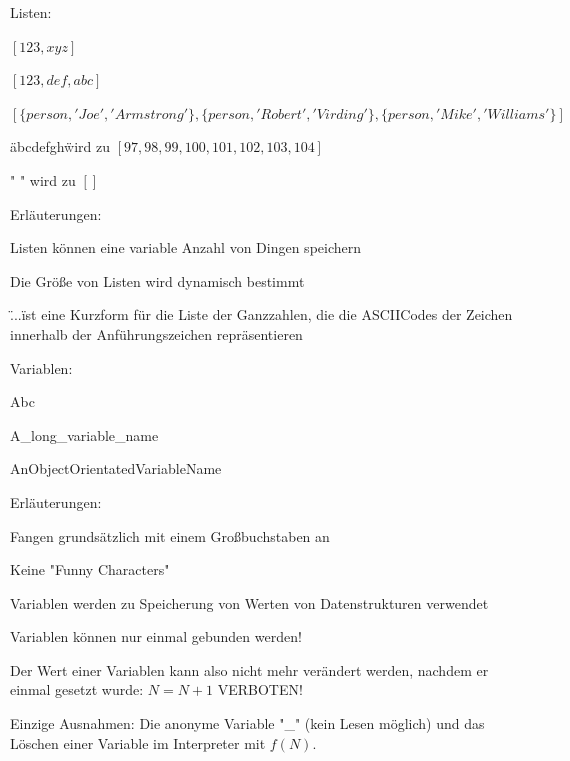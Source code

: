 \documentclass[10pt]{article}
\begin{document}
Listen:
\begin{itemize*}
  \item $[123, xyz]$
  \item $[123, def, abc]$
  \item $[\{person, 'Joe', 'Armstrong'\}, \{person, 'Robert', 'Virding'\}, \{person, 'Mike', 'Williams'\}]$
  \item \"abcdefgh\" wird zu $[97,98,99,100,101,102,103,104]$
  \item " " wird zu $[ ]$
  \item Erläuterungen:
  \begin{itemize*}
    \item Listen können eine variable Anzahl von Dingen speichern
    \item Die Größe von Listen wird dynamisch bestimmt
    \item \"...\" ist eine Kurzform für die Liste der Ganzzahlen, die die ASCIICodes der Zeichen innerhalb der Anführungszeichen repräsentieren
  \end{itemize*}
\end{itemize*}

Variablen:
\begin{itemize*}
  \item Abc
  \item A\_long\_variable\_name
  \item AnObjectOrientatedVariableName
  \item Erläuterungen:
  \begin{itemize*}
    \item Fangen grundsätzlich mit einem Großbuchstaben an
    \item Keine "Funny Characters"
    \item Variablen werden zu Speicherung von Werten von Datenstrukturen verwendet
    \item Variablen können nur einmal gebunden werden!
    \item Der Wert einer Variablen kann also nicht mehr verändert werden, nachdem er einmal gesetzt wurde: $N = N + 1$ VERBOTEN!
    \item Einzige Ausnahmen: Die anonyme Variable "\_" (kein Lesen möglich) und das Löschen einer Variable im Interpreter mit $f(N)$.
  \end{itemize*}
\end{itemize*}
\end{document}
